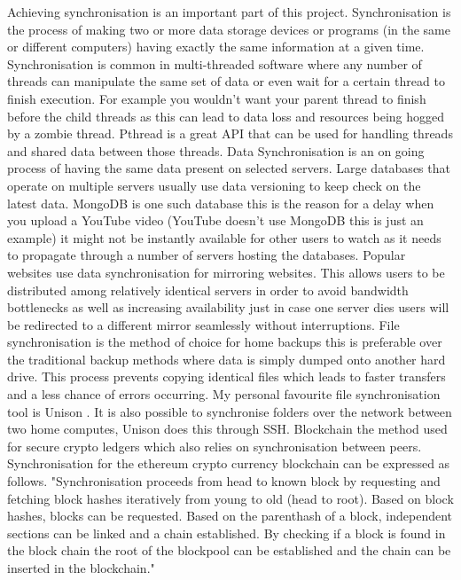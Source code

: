 Achieving synchronisation \cite{sync} is an important part of this project. 
Synchronisation is the process of making two or more data storage devices or programs (in the same or different computers) having exactly the same information at a given time.
Synchronisation is common in multi-threaded software where any number of threads can manipulate the same set of data or even wait for a certain thread to finish execution. For example you wouldn't want your parent thread to finish before the child threads as this can lead to data loss and resources being hogged by a zombie thread. Pthread \cite{pthread} is a great API that can be used for handling threads and shared data between those threads. 
Data Synchronisation \cite{datasync} is an on going process of having the same data present on selected servers. Large databases that operate on multiple servers usually use data versioning to keep check on the latest data. MongoDB is one such database \cite{mongo} this is the reason for a delay when you upload a YouTube video (YouTube doesn't use MongoDB this is just an example) it might not be instantly available for other users to watch as it needs to propagate through a number of servers hosting the databases.
Popular websites use data synchronisation for mirroring websites. This allows users to be distributed among relatively identical servers in order to avoid bandwidth bottlenecks as well as increasing availability just in case one server dies users will be redirected to a different mirror seamlessly without interruptions. 
File synchronisation is the method of choice for home backups this is preferable over the traditional backup methods where data is simply dumped onto another hard drive. This process prevents copying identical files which leads to faster transfers and a less chance of errors occurring. My personal favourite file synchronisation tool is Unison \cite{unison}. It is also possible to synchronise folders over the network between two home computes, Unison does this through SSH.
Blockchain \cite{blockChain} the method used for secure crypto ledgers which also relies on synchronisation between peers. Synchronisation for the ethereum crypto currency blockchain can be expressed as follows. "Synchronisation proceeds from head to known block by requesting and fetching block hashes iteratively from young to old (head to root). Based on block hashes, blocks can be requested. Based on the parenthash of a block, independent sections can be linked and a chain established. By checking if a block is found in the block chain the root of the blockpool can be established and the chain can be inserted in the blockchain."
%                                                   
%


